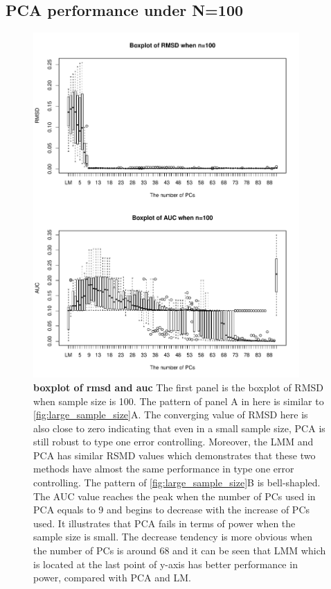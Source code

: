 \documentclass[11pt]{article}
\begin{document}
\subsection{PCA performance under N=100}
\begin{figure}[bp!]
  \centering
  \includegraphics[width=4in]{PCA_n_100_m_10_k_10.pdf}
  \caption{
    {\bf boxplot of rmsd and auc}
    The first panel is the boxplot of RMSD when sample size is 100.
    The pattern of panel A in here is similar to \cref{fig:large_sample_size}A.
    The converging value of RMSD here is also close to zero indicating that even in a small sample size, PCA is still robust to type one error controlling.
    Moreover, the LMM and PCA has similar RSMD values which demonstrates that these two methods have almost the same performance in type one error controlling.
    The pattern of \cref{fig:large_sample_size}B is bell-shapled.
    The AUC value reaches the peak when the number of PCs used in PCA equals to 9 and begins to decrease with the increase of PCs used.
    It illustrates that PCA fails in terms of power when the sample size is small.
    The decrease tendency is more obvious when the number of PCs is around 68 and it can be seen that LMM which is located at the last point of y-axis has better performance in power, compared with PCA and LM.
  }
  \label{fig:small_sample_size}
\end{figure}
\end{document}
